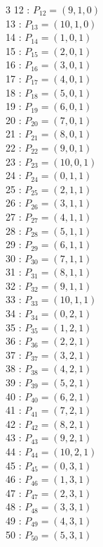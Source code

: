 \documentclass{article}
\begin{document}
{\begin{multicols}{3}
12 : $P_{12}=( 9, 1, 0 )$\\
13 : $P_{13}=( 10, 1, 0 )$\\
14 : $P_{14}=( 1, 0, 1 )$\\
15 : $P_{15}=( 2, 0, 1 )$\\
16 : $P_{16}=( 3, 0, 1 )$\\
17 : $P_{17}=( 4, 0, 1 )$\\
18 : $P_{18}=( 5, 0, 1 )$\\
19 : $P_{19}=( 6, 0, 1 )$\\
20 : $P_{20}=( 7, 0, 1 )$\\
21 : $P_{21}=( 8, 0, 1 )$\\
22 : $P_{22}=( 9, 0, 1 )$\\
23 : $P_{23}=( 10, 0, 1 )$\\
24 : $P_{24}=( 0, 1, 1 )$\\
25 : $P_{25}=( 2, 1, 1 )$\\
26 : $P_{26}=( 3, 1, 1 )$\\
27 : $P_{27}=( 4, 1, 1 )$\\
28 : $P_{28}=( 5, 1, 1 )$\\
29 : $P_{29}=( 6, 1, 1 )$\\
30 : $P_{30}=( 7, 1, 1 )$\\
31 : $P_{31}=( 8, 1, 1 )$\\
32 : $P_{32}=( 9, 1, 1 )$\\
33 : $P_{33}=( 10, 1, 1 )$\\
34 : $P_{34}=( 0, 2, 1 )$\\
35 : $P_{35}=( 1, 2, 1 )$\\
36 : $P_{36}=( 2, 2, 1 )$\\
37 : $P_{37}=( 3, 2, 1 )$\\
38 : $P_{38}=( 4, 2, 1 )$\\
39 : $P_{39}=( 5, 2, 1 )$\\
40 : $P_{40}=( 6, 2, 1 )$\\
41 : $P_{41}=( 7, 2, 1 )$\\
42 : $P_{42}=( 8, 2, 1 )$\\
43 : $P_{43}=( 9, 2, 1 )$\\
44 : $P_{44}=( 10, 2, 1 )$\\
45 : $P_{45}=( 0, 3, 1 )$\\
46 : $P_{46}=( 1, 3, 1 )$\\
47 : $P_{47}=( 2, 3, 1 )$\\
48 : $P_{48}=( 3, 3, 1 )$\\
49 : $P_{49}=( 4, 3, 1 )$\\
50 : $P_{50}=( 5, 3, 1 )$\\

\end{multicols}}
\end{document}
